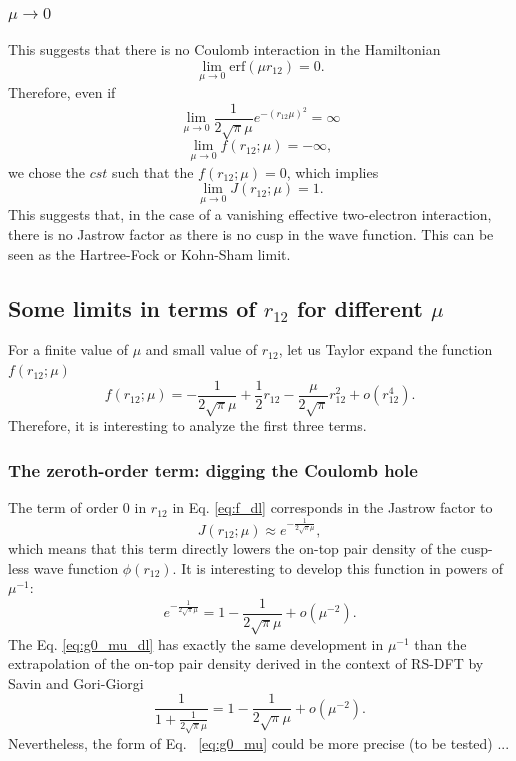 \documentclass[aip,jcp,reprint,noshowkeys,superscriptaddress]{revtex4-1}
\begin{document}
\subsubsection{$\mu \rightarrow 0$}
This suggests that there is no Coulomb interaction in the Hamiltonian 
\begin{equation}
  \lim_{\mu \rightarrow 0} \text{erf}(\mu r_{12}) = 0. 
\end{equation}
Therefore, even if 
\begin{equation}
  \lim_{\mu \rightarrow 0} \frac{1}{2\sqrt{\pi}\mu}e^{-(r_{12}\mu)^2} = \infty
\end{equation}
\begin{equation}
 \lim_{\mu \rightarrow 0} f(r_{12};\mu) = -\infty,
\end{equation}
we chose the $cst$ such that the $f(r_{12};\mu) = 0$, which implies 
\begin{equation}
 \lim_{\mu \rightarrow 0} J(r_{12};\mu) = 1. 
\end{equation}
This suggests that, in the case of a vanishing effective two-electron interaction, there is no Jastrow factor as there is no cusp in the wave function. This can be seen as the Hartree-Fock or Kohn-Sham limit. 

\subsection{Some limits in terms of $r_{12}$ for different $\mu$}
For a finite value of $\mu$ and small value of $r_{12}$, let us Taylor expand the function $f(r_{12};\mu)$
\begin{equation}
 \label{eq:f_dl}
 f(r_{12};\mu) = -\frac{1}{2\sqrt{\pi}\mu} + \frac{1}{2}r_{12} - \frac{\mu}{2\sqrt{\pi}} r_{12}^2 + o(r_{12}^4).
\end{equation}
Therefore, it is interesting to analyze the first three terms. 
\subsubsection{The zeroth-order term: digging the Coulomb hole}
The term of order $0$ in $r_{12}$ in Eq. \eqref{eq:f_dl} corresponds in the Jastrow factor to 
\begin{equation}
 \label{eq:g0_mu}
 J(r_{12};\mu) \approx  e^{-\frac{1}{2\sqrt{\pi}\mu}},
\end{equation}
which means that this term directly lowers the on-top pair density of the cusp-less wave function $\phi(r_{12})$. 
It is interesting to develop this function in powers of $\mu^{-1} $:
\begin{equation}
 \label{eq:g0_mu_dl}
 e^{-\frac{1}{2\sqrt{\pi}\mu}} = 1 - \frac{1}{2\sqrt{\pi}\mu} + o(\mu^{-2}).
\end{equation}
The Eq. \eqref{eq:g0_mu_dl} has exactly the same development in $\mu^{-1} $ than the extrapolation of the on-top pair density derived in the context of RS-DFT by Savin and Gori-Giorgi\cite{GorSav-PRA-06}
\begin{equation}
 \frac{1}{1+\frac{1}{2\sqrt{\pi}\mu}} =  1 - \frac{1}{2\sqrt{\pi}\mu} + o(\mu^{-2}).
\end{equation}
Nevertheless, the form of Eq. ~\eqref{eq:g0_mu} could be more precise (to be tested) ...
\end{document}
